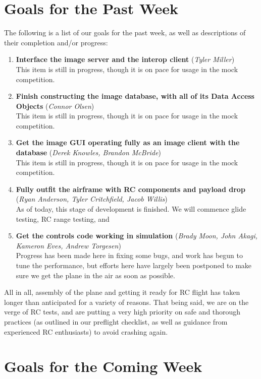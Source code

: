 \documentclass[]{../auvsi_doc}
\begin{document}
\section{Goals for the Past Week}

The following is a list of our goals for the past week, as well as descriptions of their completion and/or progress:

\begin{enumerate}
	\item \textbf{Interface the image server and the interop client} (\textit{Tyler Miller}) \\
	This item is still in progress, though it is on pace for usage in the mock competition.
	\item \textbf{Finish constructing the image database, with all of its Data Access Objects} (\textit{Connor Olsen}) \\
	This item is still in progress, though it is on pace for usage in the mock competition.
	\item \textbf{Get the image GUI operating fully as an image client with the database} (\textit{Derek Knowles, Brandon McBride}) \\
	This item is still in progress, though it is on pace for usage in the mock competition.
	\item \textbf{Fully outfit the airframe with RC components and payload drop} (\textit{Ryan Anderson, Tyler Critchfield, Jacob Willis}) \\
	As of today, this stage of development is finished. We will commence glide testing, RC range testing, and
	\item \textbf{Get the controls code working in simulation} (\textit{Brady Moon, John Akagi, Kameron Eves, Andrew Torgesen}) \\
	Progress has been made here in fixing some bugs, and work has begun to tune the performance, but efforts here have largely been postponed to make sure we get the plane in the air as soon as possible.
\end{enumerate}

All in all, assembly of the plane and getting it ready for RC flight has taken longer than anticipated for a variety of reasons. That being said, we are on the verge of RC tests, and are putting a very high priority on safe and thorough practices (as outlined in our preflight checklist, as well as guidance from experienced RC enthusiasts) to avoid crashing again.

\section{Goals for the Coming Week}
\end{document}
